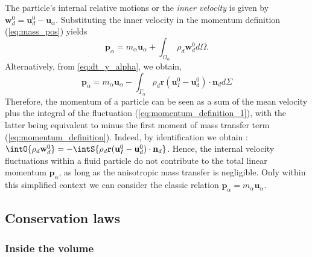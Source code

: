 The particle's internal relative motions or the \textit{inner velocity} is given by $\textbf{w}_d^0 = \textbf{u}_d^0 - \textbf{u}_\alpha$. 
Substituting the inner velocity in the momentum definition (\ref{eq:mass_pos}) yields
\begin{equation}
    \label{eq:momentum_definition_1}
    \textbf{p}_\alpha
    = m_\alpha \textbf{u}_\alpha
    + \int_{\Omega_\alpha} \rho_d \textbf{w}_d^0 d\Omega.
\end{equation}
Alternatively, from \eqref{eq:dt_y_alpha}, we obtain,
\begin{equation}
    \textbf{p}_\alpha
    =  m_\alpha \textbf{u}_\alpha
    - \int_{\Gamma_\alpha} \rho_d\textbf{r}(\textbf{u}_I^0 - \textbf{u}_d^0)\cdot \textbf{n}_d d\Sigma
    \label{eq:momentum_definition}
\end{equation}
Therefore, the momentum of a particle can be seen as a sum of the mean velocity plus the integral of the fluctuation (\ref{eq:momentum_definition_1}), with the latter being equivalent to minus the first moment of mass transfer term (\ref{eq:momentum_definition}).
Indeed, by identification we obtain : $\intO{ \rho_d \textbf{w}_d^0 } = - \intS{  \rho_d\textbf{r} (\textbf{u}_I^0 - \textbf{u}_d^0)\cdot \textbf{n}_d }$. 
Hence, the internal velocity fluctuations within a fluid particle do not contribute to the total linear momentum $\textbf{p}_\alpha$, as long as the anisotropic mass transfer is negligible.  
Only within this simplified context we can consider the classic relation $\textbf{p}_\alpha = m_\alpha \textbf{u}_\alpha$. 

\subsection{Conservation laws}



\subsubsection{Inside the volume}

 


